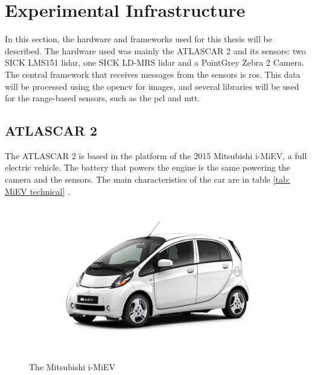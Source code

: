 \chapter{Experimental Infrastructure}

In this section, the hardware and frameworks used for this thesis will be described. The hardware used was mainly the ATLASCAR 2 and its sensors: two SICK LMS151 \gls{lidar}, one SICK LD-MRS \gls{lidar} and a PointGrey Zebra 2 Camera. The central framework that receives messages from the sensors is \gls{ros}. This data will be processed using the \gls{opencv} for images, and several libraries will be used for the range-based sensors, such as the \gls{pcl} and \gls{mtt}. 

\section{ATLASCAR 2}

The ATLASCAR 2 is based in the platform of the 2015 Mitsubishi i-MiEV, a full electric vehicle. The battery that powers the engine is the same powering the camera and the sensors. The main characteristics of the car are in table \ref{tab: MiEV technical} \cite{MITSUBISHIMOTORS}. 

\begin{figure}[htp]
	
	\centering
	\includegraphics[width=.9\textwidth]{capexp/imgs/imiev}\hfill
	
	\caption{The Mitsubishi i-MiEV}
	\label{fig:imiev}
	
\end{figure}

